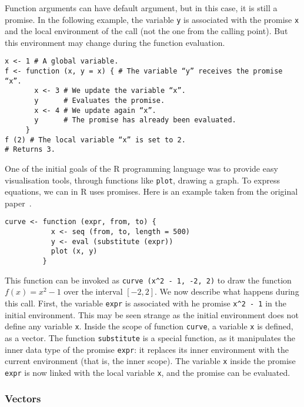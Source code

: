 \documentclass{article}
\newcommand\R{R}
\begin{document}
Function arguments can have default argument,
but in this case, it is still a promise.
In the following example,
the variable \texttt{y} is associated with
the promise \texttt{x} and the local environment
of the call (not the one from the calling point).
But this environment may change during the function evaluation.
\begin{verbatim}
x <- 1 # A global variable.
f <- function (x, y = x) { # The variable “y” receives the promise “x”.
       x <- 3 # We update the variable “x”.
       y      # Evaluates the promise.
       x <- 4 # We update again “x”.
       y      # The promise has already been evaluated.
     }
f (2) # The local variable “x” is set to 2.
# Returns 3.
\end{verbatim}

One of the initial goals of the \R{} programming language
was to provide easy visualisation tools,
through functions like \texttt{plot},
drawing a graph.
To express equations, we can in \R{} uses promises.
Here is an example taken from the original paper~\parencite{ihaka1996r}.
\begin{verbatim}
curve <- function (expr, from, to) {
           x <- seq (from, to, length = 500)
           y <- eval (substitute (expr))
           plot (x, y)
         }
\end{verbatim}
This function can be invoked as
\texttt{curve (x^2 - 1, -2, 2)}
to draw the function \(f(x) = x^2 - 1\)
over the interval \([-2, 2]\).
We now describe what happens during
this call.
First, the variable \texttt{expr}
is associated with he promise \texttt{x^2 - 1}
in the initial environment.
This may be seen strange as the initial environment
does not define any variable \texttt{x}.
Inside the scope of function \texttt{curve},
a variable \texttt{x} is defined, as a vector.
The function \texttt{substitute} is a special function,
as it manipulates the inner data type of the promise \texttt{expr}:
it replaces its inner environment with the current environment
(that is, the inner scope).
The variable \texttt{x} inside the promise
\texttt{expr} is now linked with the local
variable \texttt{x},
and the promise can be evaluated.


\subsubsection{Vectors}
\label{sec:vectors}
\end{document}
